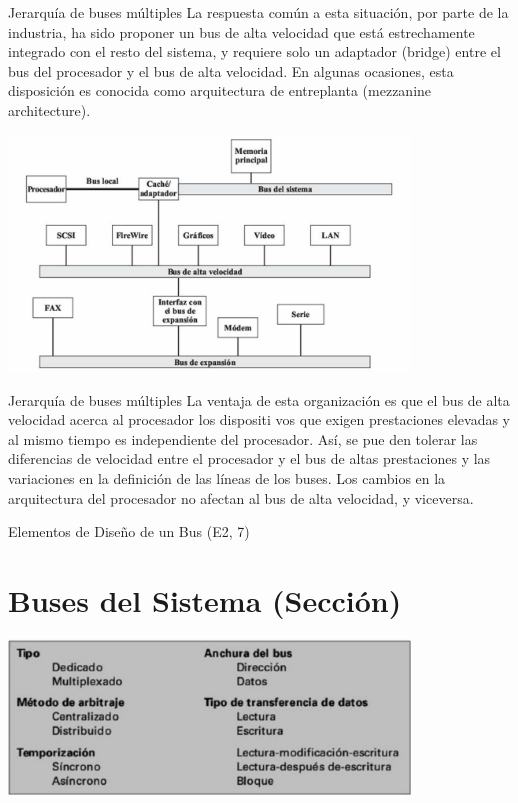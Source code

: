 \documentclass[presentation]{beamer}
\begin{document}
\begin{frame}[label={sec:org3ed469a}]{Jerarquía de buses múltiples}
La respuesta común a esta
situación, por parte de la industria, ha sido proponer un bus de alta velocidad que está estrechamente
integrado con el resto del sistema, y requiere solo un adaptador (bridge) entre el bus del procesador y
el bus de alta velocidad. En algunas ocasiones, esta disposición es conocida como arquitectura de
entreplanta (mezzanine architecture).

\begin{center}
\includegraphics[width=0.8\textwidth]{./Images/jerarquiaBuses2.jpeg}
\end{center}
\end{frame}

\begin{frame}[label={sec:org7d4c6f6}]{Jerarquía de buses múltiples}
La ventaja de esta organización es que el bus de alta velocidad acerca al procesador los dispositi
vos que exigen prestaciones elevadas y al mismo tiempo es independiente del procesador. Así, se pue
den tolerar las diferencias de velocidad entre el procesador y el bus de altas prestaciones y las
variaciones en la definición de las líneas de los buses. Los cambios en la arquitectura del procesador
no afectan al bus de alta velocidad, y viceversa.
\end{frame}
\begin{frame}[label={sec:org569936d}]{Elementos de Diseño de un Bus (E2, 7)}
\end{frame}
\section{Buses del Sistema (Sección)}
\label{sec:org53cd128}

\begin{center}
\includegraphics[width=0.8\textwidth]{./Images/bus.jpg}
\end{center}
\end{document}
